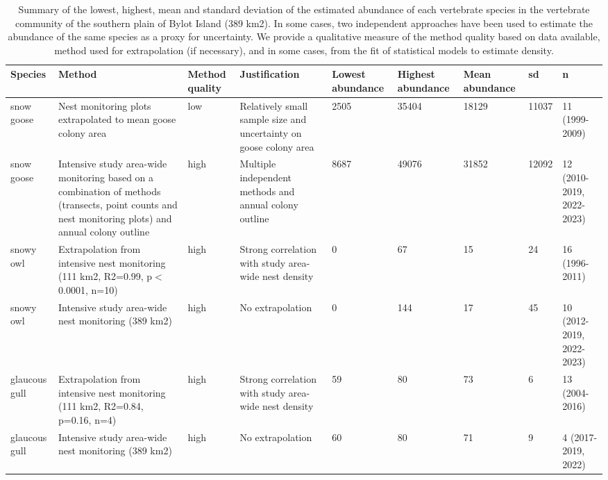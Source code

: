 \begingroup\fontsize{8pt}{10pt}\selectfont
\begin{longtable}{|p{}|p{}|p{}|p{}|p{}|p{}|p{}|p{}|p{}|}
\caption{Summary of the lowest, highest, mean and standard deviation of the estimated abundance of each vertebrate species in the vertebrate community of the southern plain of Bylot Island (389 km2). In some cases, two independent approaches have been used to estimate the abundance of the same species as a proxy for uncertainty. We provide a qualitative measure of the method quality based on data available, method used for extrapolation (if necessary), and in some cases, from the fit of statistical models to estimate density.} \\ 
  \hline
{\textbf{Species}} & {\textbf{Method}} & {\textbf{Method quality}} & {\textbf{Justification}} & {\textbf{Lowest abundance}} & {\textbf{Highest abundance}} & {\textbf{Mean abundance}} & {\textbf{sd}} & {\textbf{n}} \\ 
  \hline
snow goose & Nest monitoring plots extrapolated to mean goose colony area & low & Relatively small sample size and uncertainty on goose colony area  & 2505 & 35404 & 18129 & 11037 & 11 (1999-2009) \\ 
   \hline
snow goose & Intensive study area-wide monitoring based on a combination of methods (transects, point counts and nest monitoring plots) and annual colony outline & high & Multiple independent methods and annual colony outline & 8687 & 49076 & 31852 & 12092 & 12 (2010-2019, 2022-2023) \\ 
   \hline
snowy owl & Extrapolation from intensive nest monitoring (111 km2, R2=0.99, p$<$0.0001, n=10) & high & Strong correlation with study area-wide nest density &   0 &  67 & 15 & 24 & 16 (1996-2011) \\ 
   \hline
snowy owl & Intensive study area-wide nest monitoring (389 km2) & high & No extrapolation &   0 & 144 & 17 & 45 & 10 (2012-2019, 2022-2023) \\ 
   \hline
glaucous gull & Extrapolation from intensive nest monitoring (111 km2, R2=0.84, p=0.16, n=4) & high & Strong correlation with study area-wide nest density &  59 &  80 & 73 & 6 & 13 (2004-2016) \\ 
   \hline
glaucous gull & Intensive study area-wide nest monitoring (389 km2) & high & No extrapolation &  60 &  80 & 71 & 9 & 4 (2017-2019, 2022) \\ 

\end{longtable}
